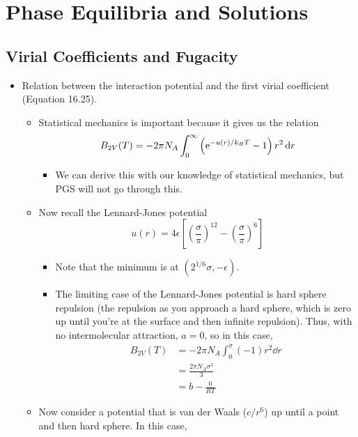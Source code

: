 \documentclass[../notes.tex]{subfiles}
\begin{document}
\chapter{Phase Equilibria and Solutions}
\section{Virial Coefficients and Fugacity}
\begin{itemize}
    \item {}Relation between the interaction potential and the first virial coefficient (Equation 16.25).
    \begin{itemize}
        \item Statistical mechanics is important because it gives us the relation
        \begin{equation*}
            B_{2V}(T) = -2\pi N_A\int_0^\infty\left( \e[-u(r)/k_BT]-1 \right)r^2\dd{r}
        \end{equation*}
        \begin{itemize}
            \item We can derive this with our knowledge of statistical mechanics, but PGS will not go through this.
        \end{itemize}
        \item Now recall the Lennard-Jones potential
        \begin{equation*}
            u(r) = 4\epsilon\left[ \left( \frac{\sigma}{\pi} \right)^{12}-\left( \frac{\sigma}{\pi} \right)^6 \right]
        \end{equation*}
        \begin{itemize}
            \item Note that the minimum is at $(2^{1/6}\sigma,-\epsilon)$.
            \item The limiting case of the Lennard-Jones potential is hard sphere repulsion (the repulsion as you approach a hard sphere, which is zero up until you're at the surface and then infinite repulsion). Thus, with no intermolecular attraction, $a=0$, so in this case,
            \begin{align*}
                B_{2V}(T) &= -2\pi N_A\int_0^\sigma(-1)r^2\dd{r}\\
                &= \frac{2\pi N_A\sigma^3}{3}\\
                &= b-\frac{0}{RT}
            \end{align*}
        \end{itemize}
        \item Now consider a potential that is van der Waals ($c/r^6$) up until a point and then hard sphere. In this case,

\end{itemize}
\end{itemize}
\end{document}
